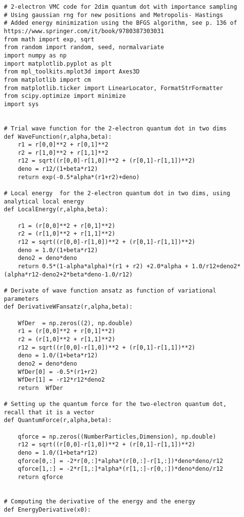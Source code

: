 \documentclass[%
oneside,                 %
final,                   %
10pt]{article}
\begin{document}
\begin{verbatim}
# 2-electron VMC code for 2dim quantum dot with importance sampling
# Using gaussian rng for new positions and Metropolis- Hastings 
# Added energy minimization using the BFGS algorithm, see p. 136 of https://www.springer.com/it/book/9780387303031
from math import exp, sqrt
from random import random, seed, normalvariate
import numpy as np
import matplotlib.pyplot as plt
from mpl_toolkits.mplot3d import Axes3D
from matplotlib import cm
from matplotlib.ticker import LinearLocator, FormatStrFormatter
from scipy.optimize import minimize
import sys


# Trial wave function for the 2-electron quantum dot in two dims
def WaveFunction(r,alpha,beta):
    r1 = r[0,0]**2 + r[0,1]**2
    r2 = r[1,0]**2 + r[1,1]**2
    r12 = sqrt((r[0,0]-r[1,0])**2 + (r[0,1]-r[1,1])**2)
    deno = r12/(1+beta*r12)
    return exp(-0.5*alpha*(r1+r2)+deno)

# Local energy  for the 2-electron quantum dot in two dims, using analytical local energy
def LocalEnergy(r,alpha,beta):
    
    r1 = (r[0,0]**2 + r[0,1]**2)
    r2 = (r[1,0]**2 + r[1,1]**2)
    r12 = sqrt((r[0,0]-r[1,0])**2 + (r[0,1]-r[1,1])**2)
    deno = 1.0/(1+beta*r12)
    deno2 = deno*deno
    return 0.5*(1-alpha*alpha)*(r1 + r2) +2.0*alpha + 1.0/r12+deno2*(alpha*r12-deno2+2*beta*deno-1.0/r12)

# Derivate of wave function ansatz as function of variational parameters
def DerivativeWFansatz(r,alpha,beta):
    
    WfDer  = np.zeros((2), np.double)
    r1 = (r[0,0]**2 + r[0,1]**2)
    r2 = (r[1,0]**2 + r[1,1]**2)
    r12 = sqrt((r[0,0]-r[1,0])**2 + (r[0,1]-r[1,1])**2)
    deno = 1.0/(1+beta*r12)
    deno2 = deno*deno
    WfDer[0] = -0.5*(r1+r2)
    WfDer[1] = -r12*r12*deno2
    return  WfDer

# Setting up the quantum force for the two-electron quantum dot, recall that it is a vector
def QuantumForce(r,alpha,beta):

    qforce = np.zeros((NumberParticles,Dimension), np.double)
    r12 = sqrt((r[0,0]-r[1,0])**2 + (r[0,1]-r[1,1])**2)
    deno = 1.0/(1+beta*r12)
    qforce[0,:] = -2*r[0,:]*alpha*(r[0,:]-r[1,:])*deno*deno/r12
    qforce[1,:] = -2*r[1,:]*alpha*(r[1,:]-r[0,:])*deno*deno/r12
    return qforce
    

# Computing the derivative of the energy and the energy 
def EnergyDerivative(x0):


\end{verbatim}
\end{document}
